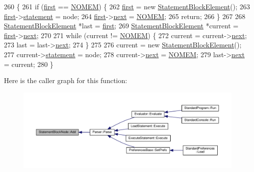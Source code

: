 \begin{DoxyCode}
260 \{
261     \textcolor{keywordflow}{if} (\hyperlink{classStatementBlockNode_a3861ceb40580ec2c56870c2834c62341}{first} == \hyperlink{platform_8h_a46ff2bfbf0d44b8466a2251d5bd5e6f8}{NOMEM}) \{
262         \hyperlink{classStatementBlockNode_a3861ceb40580ec2c56870c2834c62341}{first} = \textcolor{keyword}{new} \hyperlink{structStatementBlockElement}{StatementBlockElement}();
263         \hyperlink{classStatementBlockNode_a3861ceb40580ec2c56870c2834c62341}{first}->\hyperlink{structStatementBlockElement_a9ac07a402a18f927cb895cdbd86d6a06}{statement} = node;
264         \hyperlink{classStatementBlockNode_a3861ceb40580ec2c56870c2834c62341}{first}->\hyperlink{structStatementBlockElement_aa6001c0b1578810f85004ae397da2387}{next} = \hyperlink{platform_8h_a46ff2bfbf0d44b8466a2251d5bd5e6f8}{NOMEM};
265         \textcolor{keywordflow}{return};
266     \}
267 
268     \hyperlink{structStatementBlockElement}{StatementBlockElement} *last = \hyperlink{classStatementBlockNode_a3861ceb40580ec2c56870c2834c62341}{first};
269     \hyperlink{structStatementBlockElement}{StatementBlockElement} *current = \hyperlink{classStatementBlockNode_a3861ceb40580ec2c56870c2834c62341}{first}->\hyperlink{structStatementBlockElement_aa6001c0b1578810f85004ae397da2387}{next};
270 
271     \textcolor{keywordflow}{while} (current != \hyperlink{platform_8h_a46ff2bfbf0d44b8466a2251d5bd5e6f8}{NOMEM}) \{
272         current = current->\hyperlink{structStatementBlockElement_aa6001c0b1578810f85004ae397da2387}{next};
273         last = last->\hyperlink{structStatementBlockElement_aa6001c0b1578810f85004ae397da2387}{next};
274     \}
275 
276     current = \textcolor{keyword}{new} \hyperlink{structStatementBlockElement}{StatementBlockElement}();
277     current->\hyperlink{structStatementBlockElement_a9ac07a402a18f927cb895cdbd86d6a06}{statement} = node;
278     current->\hyperlink{structStatementBlockElement_aa6001c0b1578810f85004ae397da2387}{next} = \hyperlink{platform_8h_a46ff2bfbf0d44b8466a2251d5bd5e6f8}{NOMEM};
279     last->\hyperlink{structStatementBlockElement_aa6001c0b1578810f85004ae397da2387}{next} = current;
280 \}
\end{DoxyCode}


Here is the caller graph for this function\+:\nopagebreak
\begin{figure}[H]
\begin{center}
\leavevmode
\includegraphics[width=350pt]{classStatementBlockNode_a7cdae86c013121c1fdab0ee885c2b559_icgraph}
\end{center}
\end{figure}


